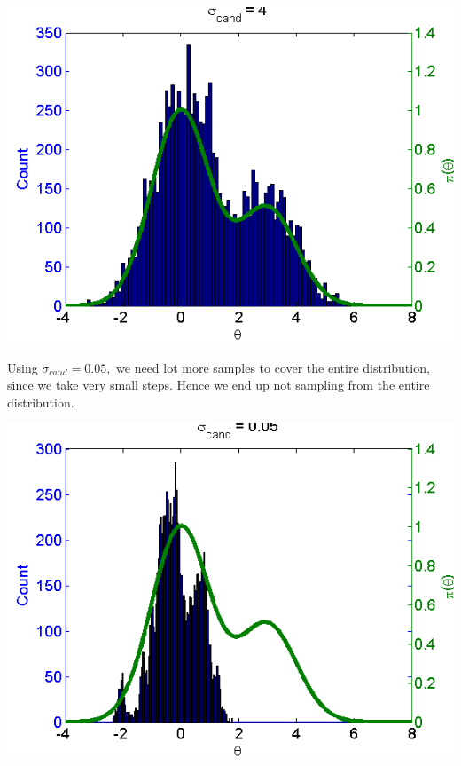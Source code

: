 \documentclass{article}
\begin{document}
\begin{center}
\includegraphics[scale=0.75]{AnalyticAndSampled4.png}\\
\end{center}

\pagebreak

Using $\sigma_{cand} = 0.05,$ we need lot more samples to cover the entire distribution, since we take very small steps. Hence we end up not sampling from the entire distribution.\\
\begin{center}
\includegraphics[scale=0.75]{AnalyticAndSampled005.png}\\
\end{center}
\end{document}
